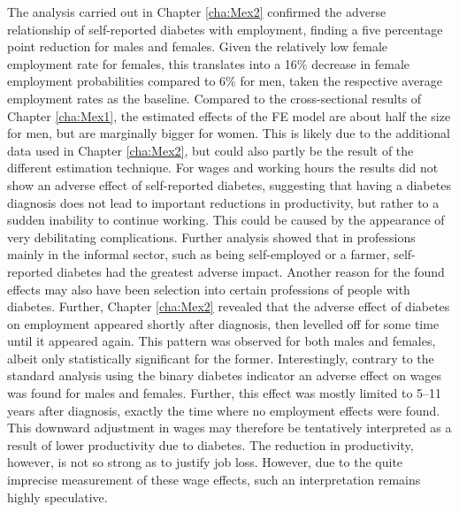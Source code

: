 The analysis carried out in Chapter \ref{cha:Mex2} confirmed the adverse relationship of self-reported diabetes with employment, finding a five percentage point reduction for males and females. Given the relatively low female employment rate for females, this translates into a 16\% decrease in female employment probabilities compared to 6\% for men, taken the respective average employment rates as the baseline. Compared to the cross-sectional results of Chapter \ref{cha:Mex1}, the estimated effects of the \ac{FE} model are about half the size for men, but are marginally bigger for women. This is likely due to the additional data used in Chapter \ref{cha:Mex2}, but could also partly be the result of the different estimation technique. For wages and working hours the results did not show an adverse effect of self-reported diabetes, suggesting that having a diabetes diagnosis does not lead to important reductions in productivity, but rather to a sudden inability to continue working. This could be caused by the appearance of very debilitating complications. Further analysis showed that in professions mainly in the informal sector, such as being self-employed or a farmer, self-reported diabetes had the greatest adverse impact. Another reason for the found effects may also have been selection into certain professions of people with diabetes. Further, Chapter \ref{cha:Mex2} revealed that the adverse effect of diabetes on employment appeared shortly after diagnosis, then levelled off for some time until it appeared again. This pattern was observed for both males and females, albeit only statistically significant for the former. Interestingly, contrary to the standard analysis using the binary diabetes indicator an adverse effect on wages was found for males and females. Further, this effect was mostly limited to 5--11 years after diagnosis, exactly the time where no employment effects were found. This downward adjustment in wages may therefore be tentatively interpreted as a result of lower productivity due to diabetes. The reduction in productivity, however, is not so strong as to justify job loss. However, due to the quite imprecise measurement of these wage effects, such an interpretation remains highly speculative.

